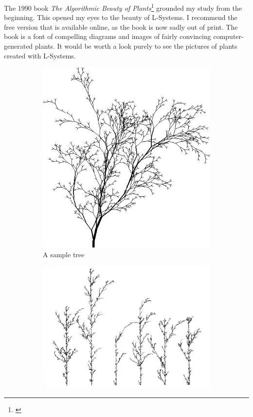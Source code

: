 \documentclass[12pt,twoside]{reedthesis}
\begin{document}
	The 1990 book \textit{The Algorithmic Beauty of Plants}\footnote{\cite{ABOP1990}} grounded my study from the beginning. This opened my eyes to the beauty of L-Systems. I recommend the free version that is available online, as the book is now sadly out of print. The book is a font of compelling diagrams and images of fairly convincing computer-generated plants. It would be worth a look purely to see the pictures of plants created with L-Systems.\\
	
	\begin{figure}[h]
	\centering
	\begin{subfigure}{0.37\linewidth}
		\centering
		\includegraphics[width=\linewidth]{Images/ABOP1}
		\caption{A sample tree}
		\label {ABOP1}
	\end{subfigure}%
	\hfill
	\begin{subfigure}{0.6\linewidth}
		\centering
		\includegraphics[width=\linewidth]{Images/ABOP4}

\end{subfigure}
\end{figure}
\end{document}
